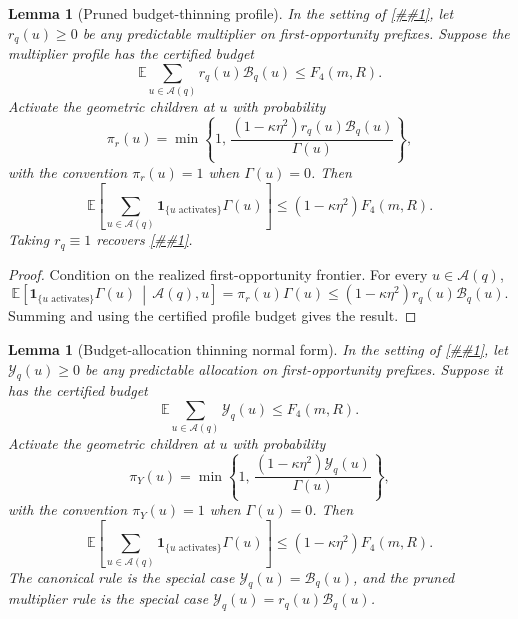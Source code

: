 \documentclass[10pt]{article}
\newcommand{\cref}[1]{\ref{##1}}
\newtheorem{lemma}[theorem]{Lemma}
\theoremstyle{definition}
\newcommand{\E}{\mathbb{E}}
\begin{document}
\begin{lemma}[Pruned budget-thinning profile]\label{lem:pruned-budget-thinning}
   In the setting of \cref{lem:budget-thinned-opportunities}, let
   \(r_q(u)\ge0\) be any predictable multiplier on first-opportunity prefixes.
   Suppose the multiplier profile has the certified budget
   \[
      \E\sum_{u\in\mathcal A(q)}
      r_q(u)\mathcal B_q(u)
      \le F_4(m,R).
   \]
   Activate the geometric children at \(u\) with probability
   \[
      \pi_r(u)
      =
      \min\left\{
         1,\,
         \frac{(1-\kappa\eta^2)r_q(u)\mathcal B_q(u)}
              {\Gamma(u)}
      \right\},
   \]
   with the convention \(\pi_r(u)=1\) when \(\Gamma(u)=0\). Then
   \[
      \E\left[
         \sum_{u\in\mathcal A(q)}
         \mathbf 1_{\{\text{$u$ activates}\}}\Gamma(u)
      \right]
      \le
      (1-\kappa\eta^2)F_4(m,R).
   \]
   Taking \(r_q\equiv1\) recovers \cref{lem:budget-thinned-opportunities}.
\end{lemma}

\begin{proof}
   Condition on the realized first-opportunity frontier. For every
   \(u\in\mathcal A(q)\),
   \[
      \E\!\left[
         \mathbf 1_{\{\text{$u$ activates}\}}\Gamma(u)
         \,\middle|\,\mathcal A(q),u
      \right]
      =
      \pi_r(u)\Gamma(u)
      \le
      (1-\kappa\eta^2)r_q(u)\mathcal B_q(u).
   \]
   Summing and using the certified profile budget gives the result.
\end{proof}

\begin{lemma}[Budget-allocation thinning normal form]
   \label{lem:budget-allocation-thinning}
   In the setting of \cref{lem:budget-thinned-opportunities}, let
   \(\mathcal Y_q(u)\ge0\) be any predictable allocation on first-opportunity
   prefixes. Suppose it has the certified budget
   \[
      \E\sum_{u\in\mathcal A(q)}\mathcal Y_q(u)
      \le F_4(m,R).
   \]
   Activate the geometric children at \(u\) with probability
   \[
      \pi_Y(u)
      =
      \min\left\{
         1,\,
         \frac{(1-\kappa\eta^2)\mathcal Y_q(u)}
              {\Gamma(u)}
      \right\},
   \]
   with the convention \(\pi_Y(u)=1\) when \(\Gamma(u)=0\). Then
   \[
      \E\left[
         \sum_{u\in\mathcal A(q)}
         \mathbf 1_{\{\text{$u$ activates}\}}\Gamma(u)
      \right]
      \le
      (1-\kappa\eta^2)F_4(m,R).
   \]
   The canonical rule is the special case
   \(\mathcal Y_q(u)=\mathcal B_q(u)\), and the pruned multiplier rule is the
   special case \(\mathcal Y_q(u)=r_q(u)\mathcal B_q(u)\).
\end{lemma}
\end{document}
